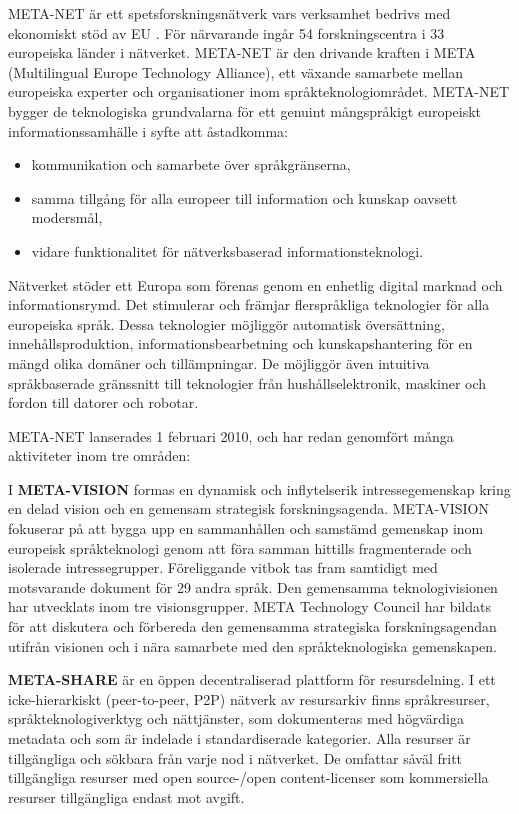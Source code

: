 \begin{multicols}{2}

META-NET är ett spets\-forsk\-nings\-nätverk vars verksamhet bedrivs
med ekonomiskt stöd av EU \cite{rehm2011}. För närvarande ingår 54
forsk\-nings\-centra i 33 europeiska länder i nätverket. META-NET är
den drivande kraften i META (Multilingual Europe Technology Alliance),
ett växande samarbete mellan europeiska experter och organisationer
inom språkteknologi\-området.  META-NET bygger de teknologiska
grundvalarna för ett genuint mångspråkigt europeiskt
informations\-samhälle i syfte att åstadkomma:

\begin{itemize}
\item kommunikation och samarbete över språkgränserna,
\item samma tillgång för alla europeer till information och kunskap oavsett modersmål,
\item vidare funktionalitet för nätverksbaserad informationsteknologi.
\end{itemize}

Nätverket stöder ett Europa som förenas genom en enhetlig digital
marknad och informationsrymd. Det stimulerar och främjar flerspråkliga
teknologier för alla europeiska språk. Dessa teknologier möjliggör
automatisk översättning, innehållsproduktion, informationsbearbetning
och kunskapshantering för en mängd olika domäner och tillämpningar. De
möjliggör även intuitiva språkbaserade gränssnitt till teknologier
från hus\-hålls\-elek\-tro\-nik, maskiner och fordon till datorer och robotar.

META-NET lanserades 1 februari 2010, och har redan genomfört många
aktiviteter inom tre områden: %

I \textbf{META-VISION} formas en dynamisk och inflytelserik
intressegemenskap kring en delad vision och en gemensam strategisk
forskningsagenda. META-VISION fokuserar på att bygga upp en
sammanhållen och samstämd gemenskap inom europeisk språkteknologi
genom att föra samman hittills fragmenterade och isolerade
intressegrupper. Föreliggande vitbok tas fram samtidigt med
motsvarande dokument för 29 andra språk.  Den gemensamma
teknologivisionen har utvecklats inom tre visionsgrupper. META
Technology Council har bildats för att diskutera och förbereda den
gemensamma strategiska forskningsagendan utifrån visionen och i nära
samarbete med den språkteknologiska gemenskapen.

\textbf{META-SHARE} är en öppen decentraliserad plattform för
resursdelning. I ett icke-hierarkiskt (peer-to-peer, P2P) nätverk av
resursarkiv finns språkresurser, språkteknologiverktyg och
nättjänster, som dokumenteras med högvärdiga metadata och som är
indelade i standardiserade kategorier. Alla resurser är tillgängliga
och sökbara från varje nod i nätverket. De omfattar såväl fritt
tillgängliga resurser med open source-/open content-licenser som
kommersiella resurser tillgängliga endast mot avgift. 


\end{multicols}
